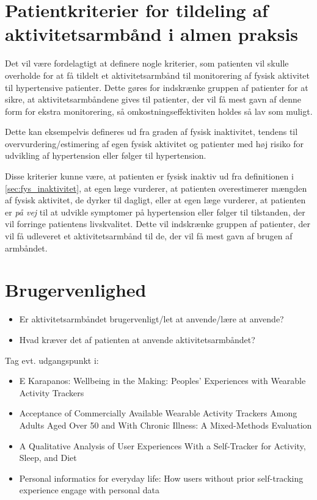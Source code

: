 \section{Patientkriterier for tildeling af aktivitetsarmbånd i almen praksis}

\noindent
Det vil være fordelagtigt at definere nogle kriterier, som patienten vil skulle overholde for at få tildelt et aktivitetsarmbånd til monitorering af fysisk aktivitet til hypertensive patienter. Dette gøres for indskrænke gruppen af patienter for at sikre, at aktivitetsarmbåndene gives til patienter, der vil få mest gavn af denne form for ekstra monitorering, så omkostningseffektiviten holdes så lav som muligt.

Dette kan eksempelvis defineres ud fra graden af fysisk inaktivitet, tendens til overvurdering/estimering af egen fysisk aktivitet og patienter med høj risiko for udvikling af hypertension eller følger til hypertension. 

Disse kriterier kunne være, at patienten er fysisk inaktiv ud fra definitionen i \autoref{sec:fys_inaktivitet}, at egen læge vurderer, at patienten overestimerer mængden af fysisk aktivitet, de dyrker til dagligt, eller at egen læge vurderer, at patienten er \textit{på vej} til at udvikle symptomer på hypertension eller følger til tilstanden, der vil forringe patientens livskvalitet. Dette vil indskrænke gruppen af patienter, der vil få udleveret et aktivitetsarmbånd til de, der vil få mest gavn af brugen af armbåndet. 


\section{Brugervenlighed}
\begin{itemize}
\item Er aktivitetsarmbåndet brugervenligt/let at anvende/lære at anvende?
\item Hvad kræver det af patienten at anvende aktivitetsarmbåndet?
\end{itemize}
Tag evt. udgangspunkt i: 
\begin{itemize}
\item E Karapanos: Wellbeing in the Making: Peoples' Experiences with Wearable Activity Trackers
\item Acceptance of Commercially Available Wearable Activity Trackers Among Adults Aged Over 50 and With Chronic Illness: A Mixed-Methods Evaluation
\item A Qualitative Analysis of User Experiences With a Self-Tracker for Activity, Sleep, and Diet
\item Personal informatics for everyday life: How users without prior self-tracking experience engage with personal data
\end{itemize}

